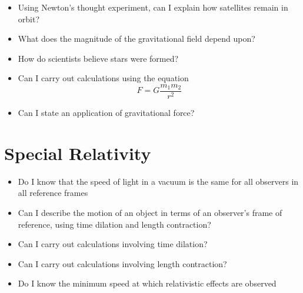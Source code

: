 \begin{multicols}{2}
\begin{itemize}
            \item Using Newton’s thought experiment, can I explain how
                satellites remain in orbit?

            \item What does the magnitude of the gravitational field depend
                upon?

            \item How do scientists believe stars were formed?

            \item Can I carry out calculations using the equation \\
                \[ F = G\frac{m_1 m_2}{r^2} \]

            \item Can I state an application of gravitational force?
        \end{itemize}
    \end{multicols}

    \section{Special Relativity}
    \begin{multicols}{2}
        \begin{itemize}
            \item Do I know that the speed of light in a vacuum is the same
                for all observers in all reference frames

            \item Can I describe the motion of an object in terms of an
                observer’s frame of reference, using time dilation and
                length contraction?

            \item Can I carry out calculations involving time dilation?

            \item Can I carry out calculations involving length contraction?

            \item Do I know the minimum speed at which relativistic effects
                are observed
        \end{itemize}
\end{multicols}


